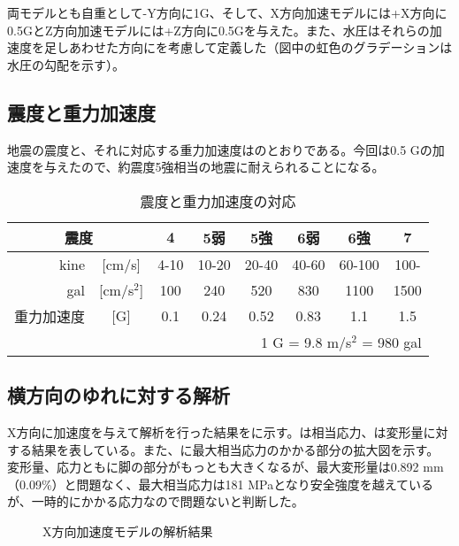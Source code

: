 両モデルとも自重として-Y方向に1G、そして、X方向加速モデルには+X方向に0.5GとZ方向加速モデルには+Z方向に0.5Gを与えた。また、水圧はそれらの加速度を足しあわせた方向にを考慮して定義した（図中の虹色のグラデーションは水圧の勾配を示す）。

\subsection{震度と重力加速度}
地震の震度と、それに対応する重力加速度はのとおりである。今回は0.5 Gの加速度を与えたので、約震度5強相当の地震に耐えられることになる。

\begin{table}[htbp]
\caption[震度と重力加速度]{震度と重力加速度の対応}
\begin{center}
\begin{tabular}{rccccccc}
\hline \hline
\multicolumn{2}{c}{震度} & 4 & 5弱 & 5強 & 6弱 & 6強 & 7\\ \hline
kine & [cm/s] & 4-10 & 10-20 & 20-40& 40-60 & 60-100 & 100-\\
gal & [cm/s$^{2}$] & 100 & 240 & 520 & 830 & 1100 & 1500\\
重力加速度 & [G] & 0.1 & 0.24 & 0.52 & 0.83 & 1.1 & 1.5\\
\hline \hline
\multicolumn{8}{r}{1 G = 9.8 m/s$^{2}$ = 980 gal}
\end{tabular}
\end{center}
\label{SeismicClass}
\end{table}%



\subsection{横方向のゆれに対する解析}
X方向に加速度を与えて解析を行った結果をに示す。は相当応力、は変形量に対する結果を表している。また、に最大相当応力のかかる部分の拡大図を示す。
変形量、応力ともに脚の部分がもっとも大きくなるが、最大変形量は0.892 mm（0.09\%）と問題なく、最大相当応力は181 MPaとなり安全強度を越えているが、一時的にかかる応力なので問題ないと判断した。

\begin{figure}[htbp]
  \begin{minipage}{0.47\textwidth}
  \end{minipage}
  \hfill
  \begin{minipage}{0.47\textwidth}
  \end{minipage}
    \caption{X方向加速度モデルの解析結果}
  \label{Xmatome}
\end{figure}

